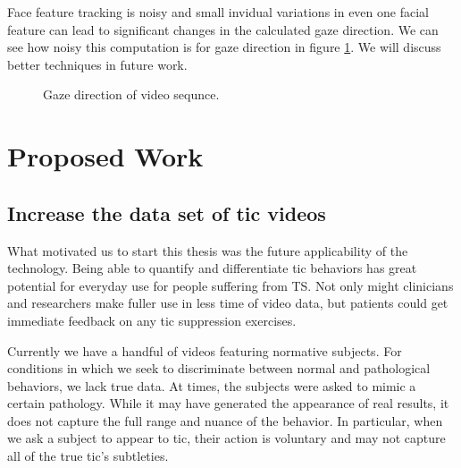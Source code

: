 \documentclass[11pt]{article}
\begin{document}
Face feature tracking is noisy and small invidual variations in even one facial feature can lead to significant changes in the calculated gaze direction. We can see how noisy this computation is for gaze direction in figure \ref{gazegraph}. We will discuss better techniques in future work.
\begin{figure}%
    \centering
    \caption{Gaze direction of video sequnce.}
    \label{gazegraph}%
\end{figure}


\section{Proposed Work}
\subsection{Increase the data set of tic videos}
What motivated us to start this thesis was the future applicability of the technology. Being able to quantify and differentiate tic behaviors has great potential for everyday use for people suffering from TS. Not only might clinicians and researchers make fuller use in less time of video data, but patients could get immediate feedback on any tic suppression exercises.

Currently we have a handful of videos featuring normative subjects. For conditions in which we seek to discriminate between normal and pathological behaviors, we lack true data. At times, the subjects were asked to mimic a certain pathology. While it may have generated the appearance of real results, it does not capture the full range and nuance of the behavior. In particular, when we ask a subject to appear to tic, their action is voluntary and may not capture all of the true tic's subtleties.
\end{document}

